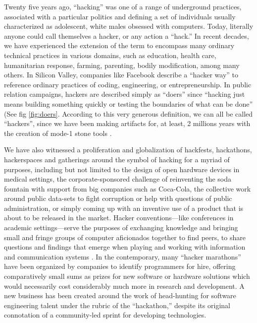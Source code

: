 \documentclass[10pt,letter,oneside]{scrartcl}
\begin{document}
Twenty five years ago, ``hacking'' was one of a range of underground practices,
associated with a particular politics and defining a set of individuals usually
characterized as adolescent, white males obsessed with computers.  Today,
literally anyone could call themselves a hacker, or any action a ``hack.'' In
recent decades, we have experienced the extension of the term to encompass many
ordinary technical practices in various domains, such as education, health care,
humanitarian response, farming, parenting, bodily modification, among many
others.  In Silicon Valley, companies like Facebook describe a ``hacker way'' to
reference ordinary practices of coding, engineering, or entrepreneurship.  In
public relation campaigns, hackers are described simply as ``doers'' since
``hacking just means building something quickly or testing the boundaries of
what can be done'' (See fig \ref{fig:doers}. According to this very generous
definition, we can all be called ``hackers'', since we have been making
artifacts for, at least, 2 millions years with the creation of mode-1 stone
tools \parencite{clark_world_1961}.

We have also witnessed a proliferation and globalization of hackfests,
hackathons, hackerspaces and gatherings around the symbol of hacking for a
myriad of purposes, including but not limited to the design of open hardware
devices in medical settings, the corporate-sponsored challenge of reinventing
the soda fountain with support from big companies such as Coca-Cola, the
collective work around public data-sets to fight corruption or help with
questions of public administration, or simply coming up with an inventive use of
a product that is about to be released in the market.  Hacker conventions---like
conferences in academic settings---serve the purposes of exchanging knowledge
and bringing small and fringe groups of computer aficionados together to find
peers, to share questions and findings that emerge when playing and working with
information and communication systems \parencite{coleman_conference_2010}.  In
the contemporary, many ``hacker marathons'' have been organized by companies to
identify programmers for hire, offering comparatively small sums as prizes for
new software or hardware solutions which would necessarily cost considerably
much more in research and development.  A new business has been created around
the work of head-hunting for software engineering talent under the rubric of the
``hackathon,'' despite its original connotation of a community-led sprint for
developing technologies.
\end{document}
